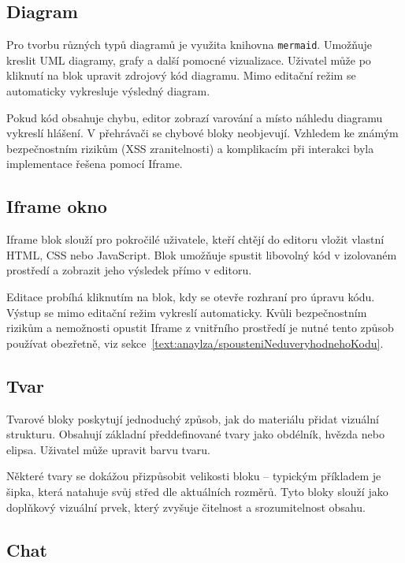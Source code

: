 \subsection{Diagram}

Pro tvorbu různých typů diagramů je využita knihovna \texttt{mermaid}. 
Umožňuje kreslit UML diagramy, grafy a další pomocné vizualizace. 
Uživatel může po kliknutí na blok upravit zdrojový kód diagramu. 
Mimo editační režim se automaticky vykresluje výsledný diagram.

Pokud kód obsahuje chybu, editor zobrazí varování a místo náhledu diagramu vykreslí hlášení.
V přehrávači se chybové bloky neobjevují. 
Vzhledem ke známým bezpečnostním rizikům (XSS zranitelnosti) a komplikacím při interakci byla implementace řešena pomocí Iframe.

\subsection{Iframe okno}

Iframe blok slouží pro pokročilé uživatele, kteří chtějí do editoru vložit vlastní HTML, CSS nebo JavaScript. 
Blok umožňuje spustit libovolný kód v izolovaném prostředí a zobrazit jeho výsledek přímo v editoru.

Editace probíhá kliknutím na blok, kdy se otevře rozhraní pro úpravu kódu. 
Výstup se mimo editační režim vykreslí automaticky. 
Kvůli bezpečnostním rizikům a nemožnosti opustit Iframe z vnitřního prostředí je nutné tento způsob používat obezřetně, viz sekce~\ref{text:anaylza/spousteniNeduveryhodnehoKodu}.

\subsection{Tvar}

Tvarové bloky poskytují jednoduchý způsob, jak do materiálu přidat vizuální strukturu. 
Obsahují základní předdefinované tvary jako obdélník, hvězda nebo elipsa. Uživatel může upravit barvu tvaru.

Některé tvary se dokážou přizpůsobit velikosti bloku -- typickým příkladem je šipka, která natahuje svůj střed dle aktuálních rozměrů.
Tyto bloky slouží jako doplňkový vizuální prvek, který zvyšuje čitelnost a srozumitelnost obsahu.

\subsection{Chat}

